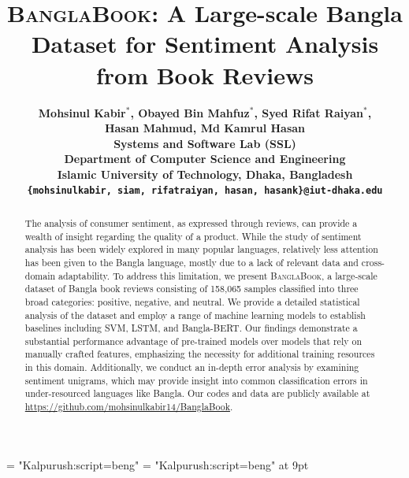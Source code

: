 \documentclass[11pt]{article}
\title{\textsc{BanglaBook}: A Large-scale Bangla Dataset for Sentiment Analysis from Book Reviews} %
\author{\bf Mohsinul Kabir$^*$, 
{\bf Obayed Bin Mahfuz$^*$,}
{\bf Syed Rifat Raiyan$^*$,}\\ 
{\bf Hasan Mahmud,}
{\bf Md Kamrul Hasan}\\
Systems and Software Lab (SSL)\\ Department of Computer Science and Engineering\\
Islamic University of Technology, Dhaka, Bangladesh\\
\texttt{\{mohsinulkabir, siam, rifatraiyan, hasan, hasank\}@iut-dhaka.edu}\\
}
\begin{document}
\font \bangla = "Kalpurush:script=beng"
\font \smallbangla = "Kalpurush:script=beng" at 9pt

\maketitle
\def\thefootnote{*}
\def\thefootnote{\arabic{footnote}}
\begin{abstract}
The analysis of consumer sentiment, as expressed through reviews, can provide a wealth of insight regarding the quality of a product. While the study of sentiment analysis has been widely explored in many popular languages, relatively less attention has been given to the Bangla language, mostly due to a lack of relevant data and cross-domain adaptability. To address this limitation, we present \textsc{BanglaBook}, a large-scale dataset of Bangla book reviews consisting of 158,065 samples classified into three broad categories: positive, negative, and neutral. We provide a detailed statistical analysis of the dataset and employ a range of machine learning models to establish baselines including SVM, LSTM, and Bangla-BERT. Our findings demonstrate a substantial performance advantage of pre-trained models over models that rely on manually crafted features, emphasizing the necessity for additional training resources in this domain. Additionally, we conduct an in-depth error analysis by examining sentiment unigrams, which may provide insight into common classification errors in under-resourced languages like Bangla. Our codes and data are publicly available at \url{https://github.com/mohsinulkabir14/BanglaBook}.
\end{abstract}







%

\end{document}
